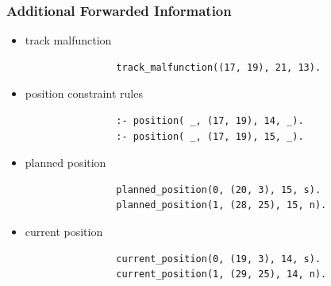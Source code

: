 \documentclass{beamer}
\begin{document}

\begin{frame}[fragile]
	\frametitle{Additional Forwarded Information}
	\begin{itemize}
		\item track malfunction 
			\begin{verbatim}
				track_malfunction((17, 19), 21, 13).
			\end{verbatim}
		\item position constraint rules
			\begin{verbatim}
				:- position( _, (17, 19), 14, _).
				:- position( _, (17, 19), 15, _).
			\end{verbatim}
		\item planned position
			\begin{verbatim}
				planned_position(0, (20, 3), 15, s).
				planned_position(1, (28, 25), 15, n).
			\end{verbatim}
		\item current position
			\begin{verbatim}
				current_position(0, (19, 3), 14, s).
				current_position(1, (29, 25), 14, n).
			\end{verbatim}
	\end{itemize}

\end{frame}

\end{document}
